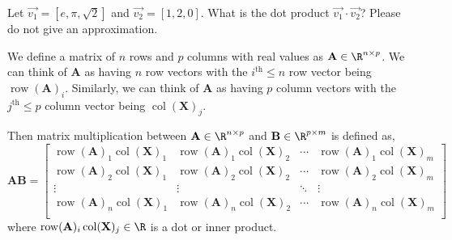 \documentclass{homework}
\DeclareMathOperator{\row}{row}
\DeclareMathOperator{\col}{col}
\begin{document}
\question Let $\vec{v_1} = [e, \pi, \sqrt{2}]$ and $\vec{v_2} = [1, 2, 0]$. What is the dot product $\vec{v_1} \cdot \vec{v_2}$? Please do not give an approximation.

\question We define a matrix of $n$ rows and $p$ columns with real values as $\mathbf{A} \in \R^{n\times p}$. We can think of $\mathbf{A}$ as having $n$ row vectors with the $i^\text{th} \leq n$ row vector being $\row(\mathbf{A})_i$. Similarly, we can think of $\mathbf{A}$ as having $p$ column vectors with the $j^\text{th} \leq p$ column vector being $\col(\mathbf{X})_j$.

Then matrix multiplication between $\mathbf{A} \in \R^{n\times p}$ and $\mathbf{B} \in \R^{p\times m}$ is defined as,
\[
  \mathbf{AB} =
  \begin{bmatrix}
    \row(\mathbf{A})_1\col(\mathbf{X})_1 & \row(\mathbf{A})_1\col(\mathbf{X})_2 & \cdots & \row(\mathbf{A})_1\col(\mathbf{X})_m \\
    \row(\mathbf{A})_2\col(\mathbf{X})_1 & \row(\mathbf{A})_2\col(\mathbf{X})_2 & \cdots & \row(\mathbf{A})_2\col(\mathbf{X})_m \\
    \vdots                               & \vdots                               & \ddots & \vdots                               \\
    \row(\mathbf{A})_n\col(\mathbf{X})_1 & \row(\mathbf{A})_n\col(\mathbf{X})_2 & \cdots & \row(\mathbf{A})_n\col(\mathbf{X})_m \\
  \end{bmatrix}
\]
where $\row(\mathbf{A})_i\col(\mathbf{X})_j \in \R$ is a dot or inner product.
\end{document}
